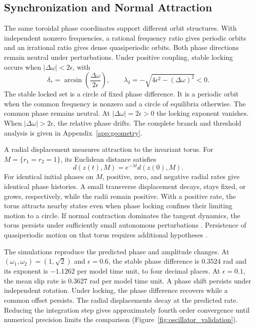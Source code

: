 \documentclass[12pt,a4paper]{article}
\begin{document}
\subsection{Synchronization and Normal Attraction}

The same toroidal phase coordinates support different orbit structures. With independent nonzero frequencies, a rational frequency ratio gives periodic orbits and an irrational ratio gives dense quasiperiodic orbits. Both phase directions remain neutral under perturbations. Under positive coupling, stable locking occurs when $|\Delta\omega|<2\epsilon$, with
\begin{equation}\label{eq:locking}
 \delta_* = \arcsin\!\left(\frac{\Delta\omega}{2\epsilon}\right),\qquad
 \lambda_\delta=-\sqrt{4\epsilon^2-(\Delta\omega)^2}<0.
\end{equation}
The stable locked set is a circle of fixed phase difference. It is a periodic orbit when the common frequency is nonzero and a circle of equilibria otherwise. The common phase remains neutral. At $|\Delta\omega|=2\epsilon>0$ the locking exponent vanishes. When $|\Delta\omega|>2\epsilon$, the relative phase drifts. The complete branch and threshold analysis is given in Appendix~\ref{app:geometry}.

A radial displacement measures attraction to the invariant torus. For $M=\{r_1=r_2=1\}$, its Euclidean distance satisfies
\begin{equation}\label{eq:normal_distance}
 d(z(t),M)=e^{-\lambda t}d(z(0),M).
\end{equation}
For identical initial phases on $M$, positive, zero, and negative radial rates give identical phase histories. A small transverse displacement decays, stays fixed, or grows, respectively, while the radii remain positive. With a positive rate, the torus attracts nearby states even when phase locking confines their limiting motion to a circle. If normal contraction dominates the tangent dynamics, the torus persists under sufficiently small autonomous perturbations \cite{BergerBounemoura2013}. Persistence of quasiperiodic motion on that torus requires additional hypotheses \cite{Broer1996}.

The simulations reproduce the predicted phase and amplitude changes. At $(\omega_1,\omega_2)=(1,\sqrt{2})$ and $\epsilon=0.6$, the stable phase difference is $0.3524$ rad and its exponent is $-1.1262$ per model time unit, to four decimal places. At $\epsilon=0.1$, the mean slip rate is $0.3627$ rad per model time unit. A phase shift persists under independent rotation. Under locking, the phase difference recovers while a common offset persists. The radial displacements decay at the predicted rate. Reducing the integration step gives approximately fourth order convergence until numerical precision limits the comparison (Figure~\ref{fig:oscillator_validation}).
\end{document}
